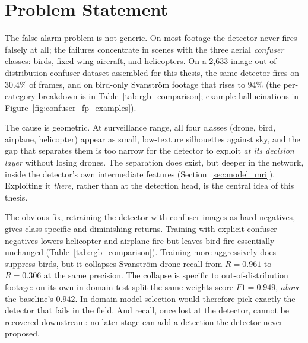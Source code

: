 \section{Problem Statement}
\label{sec:problem}

The false-alarm problem is not generic. On most footage the detector never fires falsely at all; the failures concentrate in scenes with the three aerial \emph{confuser} classes: birds, fixed-wing aircraft, and helicopters. On a 2{,}633-image out-of-distribution confuser dataset assembled for this thesis, the same detector fires on $30.4\%$ of frames, and on bird-only Svanstr\"om footage that rises to $94\%$ (the per-category breakdown is in Table~\ref{tab:rgb_comparison}; example hallucinations in Figure~\ref{fig:confuser_fp_examples}).

The cause is geometric. At surveillance range, all four classes (drone, bird, airplane, helicopter) appear as small, low-texture silhouettes against sky, and the gap that separates them is too narrow for the detector to exploit \emph{at its decision layer} without losing drones. The separation does exist, but deeper in the network, inside the detector's own intermediate features (Section~\ref{sec:model_mri}). Exploiting it \emph{there}, rather than at the detection head, is the central idea of this thesis.

The obvious fix, retraining the detector with confuser images as hard negatives, gives class-specific and diminishing returns. Training with explicit confuser negatives lowers helicopter and airplane fire but leaves bird fire essentially unchanged (Table~\ref{tab:rgb_comparison}). Training more aggressively does suppress birds, but it collapses Svanstr\"om drone recall from $R=0.961$ to $R=0.306$ at the same precision. The collapse is specific to out-of-distribution footage: on its own in-domain test split the same weights score $F1=0.949$, \emph{above} the baseline's $0.942$. In-domain model selection would therefore pick exactly the detector that fails in the field. And recall, once lost at the detector, cannot be recovered downstream: no later stage can add a detection the detector never proposed.

